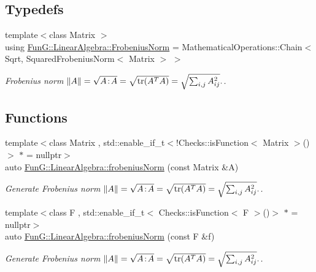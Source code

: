 \subsection*{Typedefs}
\begin{DoxyCompactItemize}
\item 
{\footnotesize template$<$class Matrix $>$ }\\using \hyperlink{group__LinearAlgebraGroup_gad209833e37a25e863fe72868d37795b8}{Fun\-G\-::\-Linear\-Algebra\-::\-Frobenius\-Norm} = Mathematical\-Operations\-::\-Chain$<$ Sqrt, Squared\-Frobenius\-Norm$<$ Matrix $>$ $>$
\begin{DoxyCompactList}\small\item\em Frobenius norm $ \|A\| = \sqrt{A\negthinspace : \negthinspace A }= \sqrt{\mathrm{tr}(A^TA)} = \sqrt{\sum_{i,j} A_{ij}^2}. $. \end{DoxyCompactList}\end{DoxyCompactItemize}
\subsection*{Functions}
\begin{DoxyCompactItemize}
\item 
{\footnotesize template$<$class Matrix , std\-::enable\-\_\-if\-\_\-t$<$!\-Checks\-::is\-Function$<$ Matrix $>$()$>$ $\ast$  = nullptr$>$ }\\auto \hyperlink{group__LinearAlgebraGroup_gaa893e7d667dde98d2b119ca004745186}{Fun\-G\-::\-Linear\-Algebra\-::frobenius\-Norm} (const Matrix \&A)
\begin{DoxyCompactList}\small\item\em Generate Frobenius norm $ \|A\| = \sqrt{A\negthinspace : \negthinspace A }= \sqrt{\mathrm{tr}(A^TA)} = \sqrt{\sum_{i,j} A_{ij}^2}. $. \end{DoxyCompactList}\item 
{\footnotesize template$<$class F , std\-::enable\-\_\-if\-\_\-t$<$ Checks\-::is\-Function$<$ F $>$()$>$ $\ast$  = nullptr$>$ }\\auto \hyperlink{group__LinearAlgebraGroup_gafa2f358f9310cecb787620ad8ec460a6}{Fun\-G\-::\-Linear\-Algebra\-::frobenius\-Norm} (const F \&f)
\begin{DoxyCompactList}\small\item\em Generate Frobenius norm $ \|A\| = \sqrt{A\negthinspace : \negthinspace A }= \sqrt{\mathrm{tr}(A^TA)} = \sqrt{\sum_{i,j} A_{ij}^2}. $. \end{DoxyCompactList}\end{DoxyCompactItemize}
